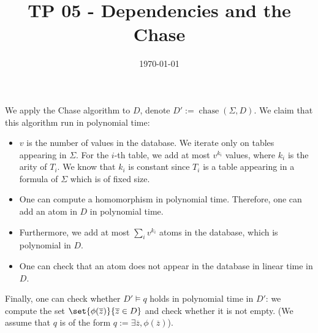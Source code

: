 \documentclass{../../cs-classes/cs-classes}
\title{TP 05 - Dependencies and the Chase}
\author{}%
\date{\today}
\DeclareMathOperator{\chase}{chase}
\begin{document}
\begin{exercise}
    We apply the Chase algorithm to $D$, denote $D':=\chase(\Sigma, D)$. We claim that this algorithm run in polynomial time:
    \begin{itemize}
        \item $v$ is the number of values in the database. We iterate only on tables appearing in $\Sigma$. For the $i$-th table, we add at most $v^{k_i}$ values, where $k_i$ is the arity of $T_i$. We know that $k_i$ is constant since $T_i$ is a table appearing in a formula of $\Sigma$ which is of fixed size.
        \item One can compute a homomorphism in polynomial time. Therefore, one can add an atom in $D$ in polynomial time.
        \item Furthermore, we add at most $\sum_i v^{k_i}$ atoms in the database, which is polynomial in $D$.
        \item One can check that an atom does not appear in the database in linear time in $D$.
    \end{itemize}
    Finally, one can check whether $D' \vDash q$ holds in polynomial time in $D'$: we compute the set $\set{\phi(\overline{z})}{\overline{z}\in D}$ and check whether it is not empty. (We assume that $q$ is of the form $q:=\exists \overline{z}, \phi\left(\overline{z}\right)$).
\end{exercise}
\end{document}
